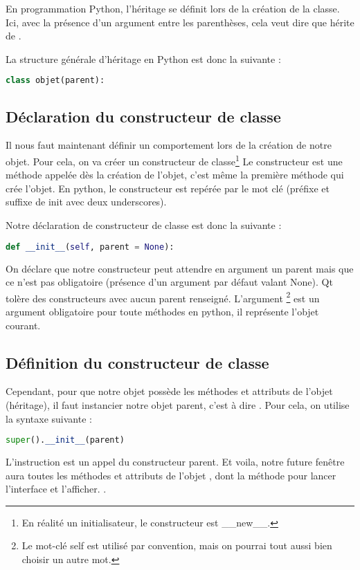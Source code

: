 {En programmation Python, l'héritage se définit lors de la création de la classe.\newline
Ici, avec la présence d'un argument entre les parenthèses, cela veut dire que  hérite de .

La structure générale d'héritage en Python est donc la suivante : 
\begin{lstlisting}[language=Python]
class objet(parent):
\end{lstlisting}

\subsection{Déclaration du constructeur de classe}

Il nous faut maintenant définir un comportement lors de la création de notre objet. \newline
Pour cela, on va créer un constructeur de classe\footnote{En réalité un initialisateur, le constructeur est \_\_new\_\_.}
Le constructeur est une méthode appelée dès la création de l'objet, c'est même la première méthode qui crée l'objet. \newline
En python, le constructeur est repérée par le mot clé  (préfixe et suffixe de init avec deux underscores).

Notre déclaration de constructeur de classe est donc la suivante : 

\begin{lstlisting}[language=Python]
    def __init__(self, parent = None):
\end{lstlisting}

On déclare que notre constructeur peut attendre en argument un parent mais que ce n'est pas obligatoire (présence d'un argument par défaut valant None). \newline Qt tolère des constructeurs avec aucun parent renseigné. \newline
L'argument \footnote{Le mot-clé self est utilisé par convention, mais on pourrai tout aussi bien choisir un autre mot.} est un argument obligatoire pour toute méthodes en python, il représente l'objet courant. 

\subsection{Définition du constructeur de classe}

Cependant, pour que notre objet possède les méthodes et attributs de l'objet  (héritage), il faut instancier notre objet parent, c'est à dire .
Pour cela, on utilise la syntaxe suivante : 
\begin{lstlisting}[language=Python]
        super().__init__(parent)
\end{lstlisting}
L'instruction  est un appel du constructeur parent. \newline
Et voila, notre future fenêtre aura toutes les méthodes et attributs de l'objet , dont la méthode pour lancer l'interface et l'afficher. \newline.

}
